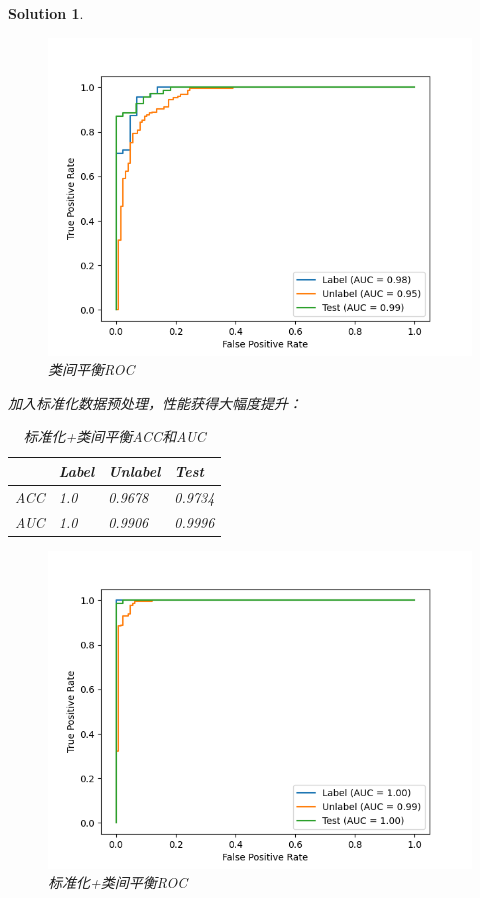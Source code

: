 \documentclass[a4paper,UTF8]{article}
\newtheorem*{solution}{Solution}
\numberwithin{equation}{section}
\begin{document}
\begin{solution}
\begin{figure}[H]
    \centering
    \includegraphics[scale=0.5]{Balanced.png}
    \caption{类间平衡ROC}
\end{figure}
加入标准化数据预处理，性能获得大幅度提升：
\begin{table}[H]
    \centering
    \begin{tabular}{|l|l|l|l|}
        \hline
        ~   & Label  & Unlabel & Test   \\ 
        \hline
        ACC & 1.0    & 0.9678  & 0.9734 \\ 
        \hline
        AUC & 1.0    & 0.9906  & 0.9996 \\
        \hline
    \end{tabular}
    \caption{标准化+类间平衡ACC和AUC}
\end{table}
\begin{figure}[H]
    \centering
    \includegraphics[scale=0.5]{Preprocess_Balanced.png}
    \caption{标准化+类间平衡ROC}
\end{figure}
\end{solution}
\end{document}
